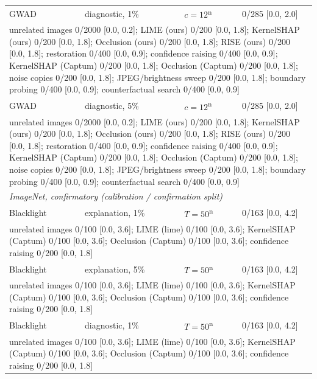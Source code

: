 \begin{footnotesize}
\begin{longtable}{p{1.6cm}p{2.6cm}p{2.8cm}p{4.6cm}}
GWAD & diagnostic, 1\% & $c=12$\textsuperscript{n} & 0/285 [0.0, 2.0] \\
\multicolumn{4}{p{12.8cm}}{\raggedright\quad unrelated images 0/2000 [0.0, 0.2]; LIME (ours) 0/200 [0.0, 1.8]; KernelSHAP (ours) 0/200 [0.0, 1.8]; Occlusion (ours) 0/200 [0.0, 1.8]; RISE (ours) 0/200 [0.0, 1.8]; restoration 0/400 [0.0, 0.9]; confidence raising 0/400 [0.0, 0.9]; KernelSHAP (Captum) 0/200 [0.0, 1.8]; Occlusion (Captum) 0/200 [0.0, 1.8]; noise copies 0/200 [0.0, 1.8]; JPEG/brightness sweep 0/200 [0.0, 1.8]; boundary probing 0/400 [0.0, 0.9]; counterfactual search 0/400 [0.0, 0.9]} \\[4pt]
GWAD & diagnostic, 5\% & $c=12$\textsuperscript{n} & 0/285 [0.0, 2.0] \\
\multicolumn{4}{p{12.8cm}}{\raggedright\quad unrelated images 0/2000 [0.0, 0.2]; LIME (ours) 0/200 [0.0, 1.8]; KernelSHAP (ours) 0/200 [0.0, 1.8]; Occlusion (ours) 0/200 [0.0, 1.8]; RISE (ours) 0/200 [0.0, 1.8]; restoration 0/400 [0.0, 0.9]; confidence raising 0/400 [0.0, 0.9]; KernelSHAP (Captum) 0/200 [0.0, 1.8]; Occlusion (Captum) 0/200 [0.0, 1.8]; noise copies 0/200 [0.0, 1.8]; JPEG/brightness sweep 0/200 [0.0, 1.8]; boundary probing 0/400 [0.0, 0.9]; counterfactual search 0/400 [0.0, 0.9]} \\[4pt]
\multicolumn{4}{l}{\emph{ImageNet, confirmatory (calibration / confirmation split)}} \\
Blacklight & explanation, 1\% & $T=50$\textsuperscript{n} & 0/163 [0.0, 4.2] \\
\multicolumn{4}{p{12.8cm}}{\raggedright\quad unrelated images 0/100 [0.0, 3.6]; LIME (lime) 0/100 [0.0, 3.6]; KernelSHAP (Captum) 0/100 [0.0, 3.6]; Occlusion (Captum) 0/100 [0.0, 3.6]; confidence raising 0/200 [0.0, 1.8]} \\[4pt]
Blacklight & explanation, 5\% & $T=50$\textsuperscript{n} & 0/163 [0.0, 4.2] \\
\multicolumn{4}{p{12.8cm}}{\raggedright\quad unrelated images 0/100 [0.0, 3.6]; LIME (lime) 0/100 [0.0, 3.6]; KernelSHAP (Captum) 0/100 [0.0, 3.6]; Occlusion (Captum) 0/100 [0.0, 3.6]; confidence raising 0/200 [0.0, 1.8]} \\[4pt]
Blacklight & diagnostic, 1\% & $T=50$\textsuperscript{n} & 0/163 [0.0, 4.2] \\
\multicolumn{4}{p{12.8cm}}{\raggedright\quad unrelated images 0/100 [0.0, 3.6]; LIME (lime) 0/100 [0.0, 3.6]; KernelSHAP (Captum) 0/100 [0.0, 3.6]; Occlusion (Captum) 0/100 [0.0, 3.6]; confidence raising 0/200 [0.0, 1.8]} \\[4pt]

\end{longtable}
\end{footnotesize}
